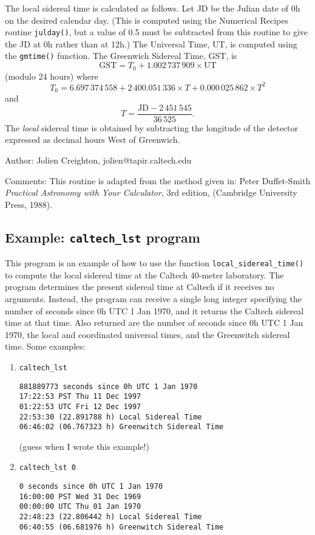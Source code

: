 The local sidereal time is calculated as follows.  Let JD be the Julian date
of 0h on the desired calendar day.  (This is computed using the Numerical
Recipes routine \texttt{julday()}, but a value of 0.5 must be subtracted from
this routine to give the JD at 0h rather than at 12h.)  The
Universal Time, UT, is computed using the \texttt{gmtime()} function.
The Greenwich Sidereal Time, GST, is
\begin{displaymath}
  \mbox{GST} = T_0 + 1.002\,737\,909\times\mbox{UT}
\end{displaymath}
(modulo 24 hours) where
\begin{displaymath}
  T_0 = 6.697\,374\,558 + 2\,400.051\,336\times T + 0.000\,025\,862\times T^2
\end{displaymath}
and
\begin{displaymath}
  T = \frac{\mbox{JD}-2\,451\,545}{36\,525}.
\end{displaymath}
The \emph{local} sidereal time is obtained by subtracting the longitude of the
detector expressed as decimal hours West of Greenwich.

\begin{description}
\item{Author:} Jolien Creighton, jolien@tapir.caltech.edu
\item{Comments:}  This routine is adapted from the method given in:
  Peter Duffet-Smith \emph{Practical Astronomy with Your Calculator,}
  3rd edition,
  (Cambridge University Press, 1988).
\end{description}

\clearpage
\subsection{Example: \texttt{caltech\_lst} program}
\label{ss:caltech_lst}

This program is an example of how to use the function
\texttt{local\_sidereal\_time()} to compute the local sidereal time
at the Caltech 40-meter laboratory.  The program determines the
present sidereal time at Caltech if it receives no arguments.  Instead,
the program can receive a single long integer specifying the number of
seconds since 0h UTC 1 Jan 1970, and it returns the Caltech sidereal
time at that time.  Also returned are the number of seconds since
0h UTC 1 Jan 1970, the local and coordinated universal times, and the
Greenwitch sidereal time.  Some examples:
\begin{enumerate}
\item \verb|caltech_lst|
\begin{verbatim}
881889773 seconds since 0h UTC 1 Jan 1970
17:22:53 PST Thu 11 Dec 1997
01:22:53 UTC Fri 12 Dec 1997
22:53:30 (22.891788 h) Local Sidereal Time
06:46:02 (06.767323 h) Greenwitch Sidereal Time
\end{verbatim}
(guess when I wrote this example!)
\item \verb|caltech_lst 0|
\begin{verbatim}
0 seconds since 0h UTC 1 Jan 1970
16:00:00 PST Wed 31 Dec 1969
00:00:00 UTC Thu 01 Jan 1970
22:48:23 (22.806442 h) Local Sidereal Time
06:40:55 (06.681976 h) Greenwitch Sidereal Time
\end{verbatim}
\end{enumerate}


